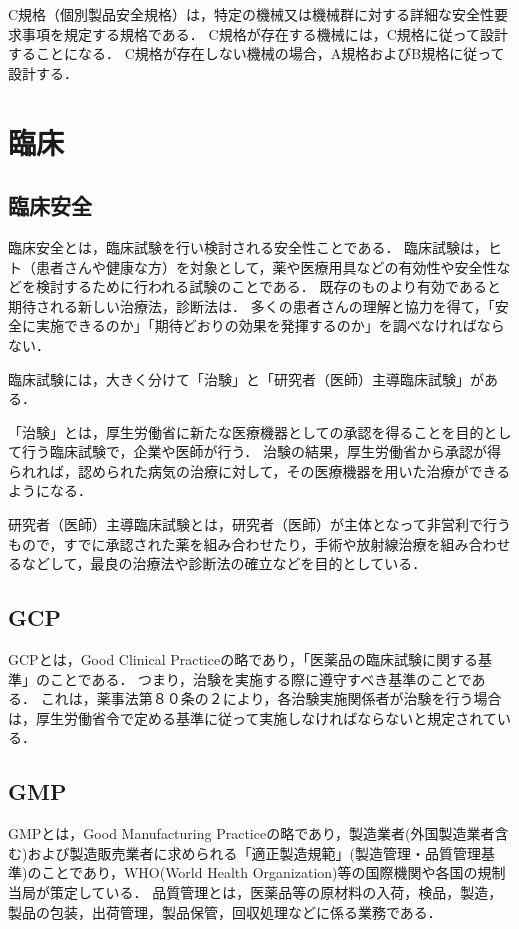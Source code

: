 \documentclass[uplatex,a4paper]{jsarticle}
\begin{document}
C規格（個別製品安全規格）は，特定の機械又は機械群に対する詳細な安全性要求事項を規定する規格である．
C規格が存在する機械には，C規格に従って設計することになる．
C規格が存在しない機械の場合，A規格およびB規格に従って設計する．



\section{臨床}
\subsection{臨床安全}
臨床安全とは，臨床試験を行い検討される安全性ことである．
臨床試験は，ヒト（患者さんや健康な方）を対象として，薬や医療用具などの有効性や安全性などを検討するために行われる試験のことである．
既存のものより有効であると期待される新しい治療法，診断法は．
多くの患者さんの理解と協力を得て，「安全に実施できるのか」「期待どおりの効果を発揮するのか」を調べなければならない．

臨床試験には，大きく分けて「治験」と「研究者（医師）主導臨床試験」がある．

「治験」とは，厚生労働省に新たな医療機器としての承認を得ることを目的として行う臨床試験で，企業や医師が行う．
治験の結果，厚生労働省から承認が得られれば，認められた病気の治療に対して，その医療機器を用いた治療ができるようになる．

研究者（医師）主導臨床試験とは，研究者（医師）が主体となって非営利で行うもので，すでに承認された薬を組み合わせたり，手術や放射線治療を組み合わせるなどして，最良の治療法や診断法の確立などを目的としている．


\subsection{GCP}
GCPとは，Good Clinical Practiceの略であり，「医薬品の臨床試験に関する基準」のことである．
つまり，治験を実施する際に遵守すべき基準のことである．
これは，薬事法第８０条の２により，各治験実施関係者が治験を行う場合は，厚生労働省令で定める基準に従って実施しなければならないと規定されている．


\subsection{GMP}
GMPとは，Good Manufacturing Practiceの略であり，製造業者(外国製造業者含む)および製造販売業者に求められる「適正製造規範」(製造管理・品質管理基準)のことであり，WHO(World Health Organization)等の国際機関や各国の規制当局が策定している．
品質管理とは，医薬品等の原材料の入荷，検品，製造，製品の包装，出荷管理，製品保管，回収処理などに係る業務である．
\end{document}
